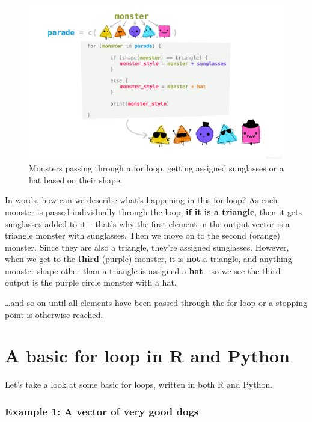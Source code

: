 \documentclass[
]{book}
\begin{document}
\begin{figure}
\centering
\includegraphics[width=6.96875in,height=\textheight]{images/for_loop_monsters.png}
\caption{Monsters passing through a for loop, getting assigned sunglasses or a hat based on their shape.}
\end{figure}

In words, how can we describe what's happening in this for loop? As each monster is passed individually through the loop, \textbf{if it is a triangle}, then it gets sunglasses added to it -- that's why the first element in the output vector is a triangle monster with sunglasses. Then we move on to the second (orange) monster. Since they are also a triangle, they're assigned sunglasses. However, when we get to the \textbf{third} (purple) monster, it is \textbf{not} a triangle, and anything monster shape other than a triangle is assigned a \textbf{hat} - so we see the third output is the purple circle monster with a hat.

\ldots and so on until all elements have been passed through the for loop or a stopping point is otherwise reached.

\hypertarget{a-basic-for-loop-in-r-and-python}{%
\section{A basic for loop in R and Python}\label{a-basic-for-loop-in-r-and-python}}

Let's take a look at some basic for loops, written in both R and Python.

\hypertarget{example-1-a-vector-of-very-good-dogs}{%
\subsubsection{Example 1: A vector of very good dogs}\label{example-1-a-vector-of-very-good-dogs}}
\end{document}
